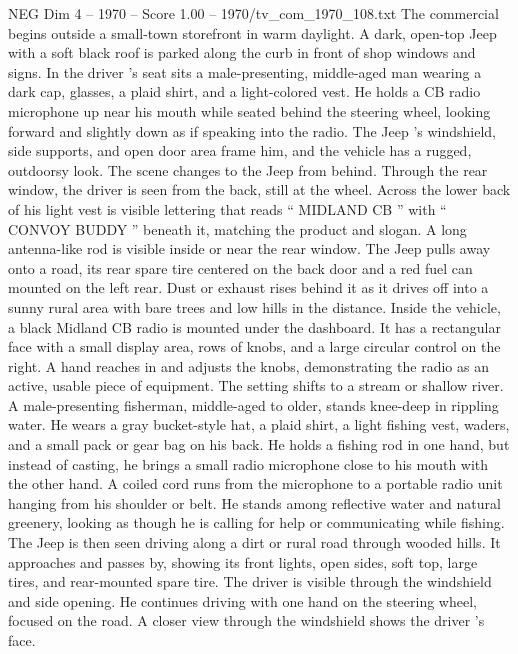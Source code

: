 \begin{textsample}{NEG Dim 4 – 1970 – Score 1.00 – 1970/tv\_com\_1970\_108.txt}  \label{ex:f4_neg_014}
The commercial begins outside a small-town storefront in warm daylight.
A dark, open-top Jeep with a soft black roof is parked along the curb in front of shop windows and signs.
In the driver ’s seat sits a male-presenting, middle-aged man wearing a dark cap, glasses, a plaid shirt, and a light-colored vest.
He holds a CB radio microphone up near his mouth while seated behind the steering wheel, looking forward and slightly down as if speaking into the radio.
The Jeep ’s windshield, side supports, and open door area frame him, and the vehicle has a rugged, outdoorsy look.
The scene changes to the Jeep from behind.
Through the rear window, the driver is seen from the back, still at the wheel.
Across the lower back of his light vest is visible lettering that reads “ MIDLAND CB ” with “ CONVOY BUDDY ” beneath it, matching the product and slogan.
A long antenna-like rod is visible inside or near the rear window.
The Jeep pulls away onto a road, its rear spare tire centered on the back door and a red fuel can mounted on the left rear.
Dust or exhaust rises behind it as it drives off into a sunny rural area with bare trees and low hills in the distance.
Inside the vehicle, a black Midland CB radio is mounted under the dashboard.
It has a rectangular face with a small display area, rows of knobs, and a large circular control on the right.
A hand reaches in and adjusts the knobs, demonstrating the radio as an active, usable piece of equipment.
The setting shifts to a stream or shallow river.
A male-presenting fisherman, middle-aged to older, stands knee-deep in rippling water.
He wears a gray bucket-style hat, a plaid shirt, a light fishing vest, waders, and a small pack or gear bag on his back.
He holds a fishing rod in one hand, but instead of casting, he brings a small radio microphone close to his mouth with the other hand.
A coiled cord runs from the microphone to a portable radio unit hanging from his shoulder or belt.
He stands among reflective water and natural greenery, looking as though he is calling for help or communicating while fishing.
The Jeep is then seen driving along a dirt or rural road through wooded hills.
It approaches and passes by, showing its front lights, open sides, soft top, large tires, and rear-mounted spare tire.
The driver is visible through the windshield and side opening.
He continues driving with one hand on the steering wheel, focused on the road.
A closer view through the windshield shows the driver ’s face.

\end{textsample}
